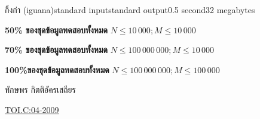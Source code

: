 \documentclass[11pt,a4paper]{article}
\begin{document}
\begin{problem}{กิ้งก่า (iguana)}{standard input}{standard output}{0.5 second}{32 megabytes}
\Scoring

\textbf{50\% ของชุดข้อมูลทดสอบทั้งหมด} $N\leq 10\,000;M \leq 10\,000$

\textbf{70\% ของชุดข้อมูลทดสอบทั้งหมด} $N \leq 100\,000\,000; M\leq 10\,000$

\textbf{100\%ของชุดข้อมูลทดสอบทั้งหมด} $N \leq 100\,000\,000; M\leq 100\,000$
\Source

ทักษพร กิตติอัครเสถียร

\underline{\href{http://www.thailandoi.org/toi.c/04-2009}{TOI.C:04-2009}}

\end{problem}
\end{document}
